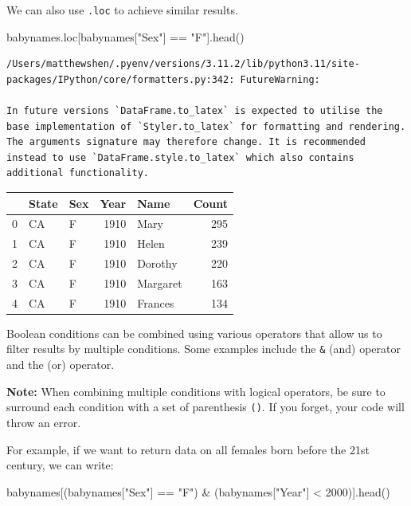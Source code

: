 \documentclass[
  letterpaper,
  DIV=11,
  numbers=noendperiod]{scrreprt}
\newenvironment{Shaded}{\begin{snugshade}}{\end{snugshade}}
\newcommand{\DecValTok}[1]{\textcolor[rgb]{0.68,0.00,0.00}{#1}}
\newcommand{\NormalTok}[1]{\textcolor[rgb]{0.00,0.23,0.31}{#1}}
\newcommand{\OperatorTok}[1]{\textcolor[rgb]{0.37,0.37,0.37}{#1}}
\newcommand{\StringTok}[1]{\textcolor[rgb]{0.13,0.47,0.30}{#1}}
\begin{document}
We can also use \texttt{.loc} to achieve similar results.

\begin{Shaded}
\begin{Highlighting}[]
\NormalTok{babynames.loc[babynames[}\StringTok{"Sex"}\NormalTok{] }\OperatorTok{==} \StringTok{"F"}\NormalTok{].head()}
\end{Highlighting}
\end{Shaded}

\begin{verbatim}
/Users/matthewshen/.pyenv/versions/3.11.2/lib/python3.11/site-packages/IPython/core/formatters.py:342: FutureWarning:

In future versions `DataFrame.to_latex` is expected to utilise the base implementation of `Styler.to_latex` for formatting and rendering. The arguments signature may therefore change. It is recommended instead to use `DataFrame.style.to_latex` which also contains additional functionality.
\end{verbatim}

\begin{tabular}{lllrlr}
\toprule
{} & State & Sex &  Year &      Name &  Count \\
\midrule
0 &    CA &   F &  1910 &      Mary &    295 \\
1 &    CA &   F &  1910 &     Helen &    239 \\
2 &    CA &   F &  1910 &   Dorothy &    220 \\
3 &    CA &   F &  1910 &  Margaret &    163 \\
4 &    CA &   F &  1910 &   Frances &    134 \\
\bottomrule
\end{tabular}

Boolean conditions can be combined using various operators that allow us
to filter results by multiple conditions. Some examples include the
\texttt{\&} (and) operator and the \texttt{\textbar{}} (or) operator.

\textbf{Note:} When combining multiple conditions with logical
operators, be sure to surround each condition with a set of parenthesis
\texttt{()}. If you forget, your code will throw an error.

For example, if we want to return data on all females born before the
21st century, we can write:

\begin{Shaded}
\begin{Highlighting}[]
\NormalTok{babynames[(babynames[}\StringTok{"Sex"}\NormalTok{] }\OperatorTok{==} \StringTok{"F"}\NormalTok{) }\OperatorTok{\&}\NormalTok{ (babynames[}\StringTok{"Year"}\NormalTok{] }\OperatorTok{\textless{}} \DecValTok{2000}\NormalTok{)].head()}
\end{Highlighting}
\end{Shaded}
\end{document}
